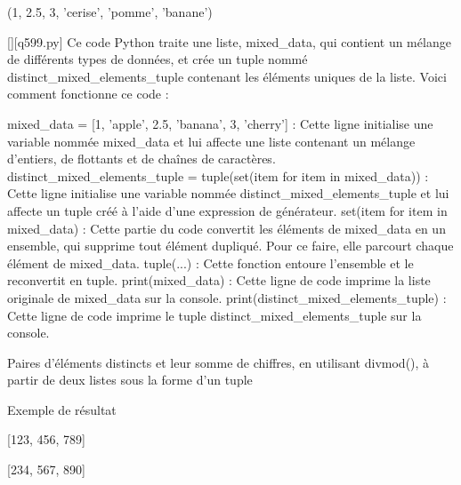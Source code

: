 (1, 2.5, 3, 'cerise', 'pomme', 'banane')
        \par
        \begin{solution}
            \renewcommand{\nomfichier}{q599.py}
            \pythonfile{\chemincode \nomfichier}[][\nomfichier]
            Ce code Python traite une liste, mixed_data, qui contient un mélange de différents types de données, et crée un tuple nommé distinct_mixed_elements_tuple contenant les éléments uniques de la liste. Voici comment fonctionne ce code :

    mixed_data = [1, 'apple', 2.5, 'banana', 3, 'cherry'] : Cette ligne initialise une variable nommée mixed_data et lui affecte une liste contenant un mélange d'entiers, de flottants et de chaînes de caractères.
    distinct_mixed_elements_tuple = tuple(set(item for item in mixed_data)) : Cette ligne initialise une variable nommée distinct_mixed_elements_tuple et lui affecte un tuple créé à l'aide d'une expression de générateur.
        set(item for item in mixed_data) : Cette partie du code convertit les éléments de mixed_data en un ensemble, qui supprime tout élément dupliqué. Pour ce faire, elle parcourt chaque élément de mixed_data.
        tuple(...) : Cette fonction entoure l'ensemble et le reconvertit en tuple.
    print(mixed_data) : Cette ligne de code imprime la liste originale de mixed_data sur la console.
    print(distinct_mixed_elements_tuple) : Cette ligne de code imprime le tuple distinct_mixed_elements_tuple sur la console.
        \end{solution}
        

        \question
        Paires d'éléments distincts et leur somme de chiffres, en utilisant divmod(), à partir de deux listes sous la forme d'un tuple

Exemple de résultat

[123, 456, 789]

[234, 567, 890]

